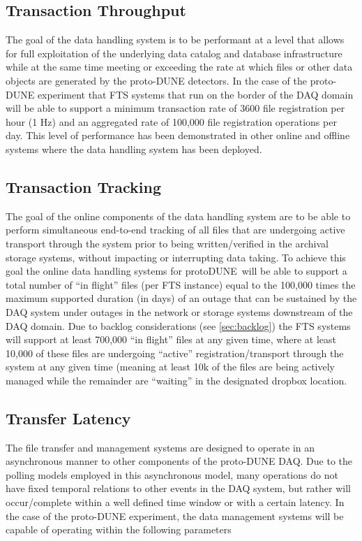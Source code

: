 \documentclass[pdftex,12pt,letter]{article}
\newcommand{\pd}{protoDUNE\ }
\begin{document}
\subsection{Transaction Throughput}

The goal of the data handling system is to be performant at a level that allows for full exploitation of the underlying data
catalog and database infrastructure while at the same time meeting or exceeding the rate at which files or other data
objects are generated by the proto-DUNE detectors.  In the case of the proto-DUNE experiment that FTS systems that run on
the border of the DAQ domain will be able to support a minimum transaction rate of 3600 file registration per hour (1 Hz)
and an aggregated rate of 100,000 file registration operations per day.  This level of performance has been demonstrated
in other online and offline systems where the data handling system has been deployed.

\subsection{Transaction Tracking}
The goal of the online components of the data handling system are to be able to perform simultaneous end-to-end tracking
of all files that are undergoing active transport through the system prior to being written/verified in the archival storage systems,
without impacting or interrupting data taking.  To achieve this goal the online data handling systems for \pd will be
able to support a total number of “in flight” files (per FTS instance) equal to the 100,000 times the maximum supported duration (in days)
of an outage that can be sustained by the DAQ system under outages in the network or storage systems downstream of the DAQ domain.
Due to backlog considerations (see \ref{sec:backlog}) the FTS systems will support at least 700,000 “in flight” files at any given time, where at least 10,000 of these
files are undergoing “active” registration/transport through the system at any given time (meaning at least 10k of the files are being actively
managed while the remainder are “waiting” in the designated dropbox location.

\subsection{Transfer Latency}
The file transfer and management systems are designed to operate in an asynchronous manner to other components of the proto-DUNE DAQ. 
Due to the polling models employed in this asynchronous model, many operations do not have fixed temporal relations to other events in the DAQ system,
but rather will occur/complete within a well defined time window or with a certain latency.  In the case of the proto-DUNE experiment,
the data management systems will be capable of operating within the following parameters
\end{document}
